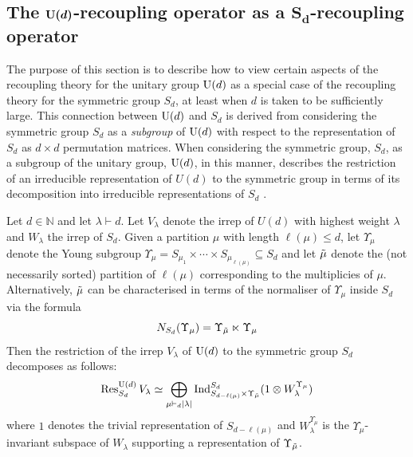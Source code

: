 \documentclass[notitlepage, 10pt]{article}
\begin{document}
\subsection{The \texorpdfstring{$\boldsymbol{\operatorname{U}(d)}$}{U(d)}-recoupling operator as a \texorpdfstring{$\boldsymbol{S_d}$}{Sd}-recoupling operator}
\label{sec:recoupling-correspondence}

The purpose of this section is to describe how to view certain aspects of the recoupling theory for the unitary group $\operatorname{U}(d)$ as a special case of the recoupling theory for the symmetric group $S_d$, at least when $d$ is taken to be sufficiently large.
This connection between $\operatorname{U}(d)$ and $S_d$ is derived from considering the symmetric group $S_d$ as a \textit{subgroup} of $\operatorname{U}(d)$ with respect to the representation of $S_d$ as $d\times d$ permutation matrices.
When considering the symmetric group, $S_d$, as a subgroup of the unitary group, $\operatorname{U}(d)$, in this manner,
\citeauthor{nishiyama2000restriction} describes the restriction of an irreducible representation of $U(d)$ to the symmetric group in terms of its decomposition into irreducible representations of $S_d$ \cite[Theorem 2.3]{nishiyama2000restriction}.
\begin{thm}
    Let $d \in \mathbb N$ and let $\lambda \vdash d$.
    Let $V_{\lambda}$ denote the irrep of $U(d)$ with highest weight $\lambda$ and $W_{\lambda}$ the irrep of $S_d$.
    Given a partition $\mu$ with length $\ell(\mu) \leq d$, let $\Upsilon_{\mu}$ denote the Young subgroup $\Upsilon_{\mu} = S_{\mu_1} \times \cdots \times S_{\mu_{\ell(\mu)}} \subseteq S_d$ and let $\tilde \mu$ denote the (not necessarily sorted) partition of $\ell(\mu)$ corresponding to the multiplicies of $\mu$.
    Alternatively, $\tilde \mu$ can be characterised in terms of the normaliser of $\Upsilon_\mu$ inside $S_d$ via the formula
    \begin{equation}
        N_{S_d}(\Upsilon_\mu) = \Upsilon_{\tilde \mu} \ltimes \Upsilon_{\mu}
    \end{equation}
    Then the restriction of the irrep $V_{\lambda}$ of $\operatorname{U}(d)$ to the symmetric group $S_d$ decomposes as follows:
    \begin{equation}
        \label{eq:nishiyama-decomp}
        \operatorname{Res}^{\operatorname{U}(d)}_{S_d} V_{\lambda} \simeq \bigoplus_{\mu \vdash_d \left|\lambda\right|} \operatorname{Ind}_{S_{d-\ell(\mu)} \times \Upsilon_{\tilde \mu}}^{S_d}(1 \otimes W_\lambda^{\Upsilon_{\mu}})
    \end{equation}
    where $1$ denotes the trivial representation of $S_{d-\ell(\mu)}$ and $W_\lambda^{\Upsilon_{\mu}}$ is the $\Upsilon_{\mu}$-invariant subspace of $W_{\lambda}$ supporting a representation of $\Upsilon_{\tilde \mu}$.
\end{thm}
\end{document}

